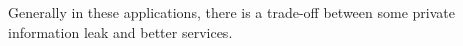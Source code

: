Generally in these applications, there is a trade-off between some 
private information leak and better services.

%




